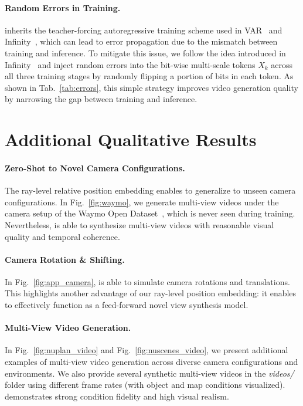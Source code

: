 \paragraph{Random Errors in Training.}
\ourmethod{} inherits the teacher-forcing autoregressive training scheme used in VAR~\cite{tian2024visual} and Infinity~\cite{han2024infinity}, which can lead to error propagation due to the mismatch between training and inference. To mitigate this issue, we follow the idea introduced in Infinity~\cite{han2024infinity} and inject random errors into the bit-wise multi-scale tokens $X_k$ across all three training stages by randomly flipping a portion of bits in each token. As shown in Tab.~\ref{tab:errors}, this simple strategy improves video generation quality by narrowing the gap between training and inference.

\section{Additional Qualitative Results}
\label{app:results}

\paragraph{Zero-Shot to Novel Camera Configurations.} The ray-level relative position embedding enables \ourmethod{} to generalize to unseen camera configurations. In Fig.~\ref{fig:waymo}, we generate multi-view videos under the camera setup of the Waymo Open Dataset~\cite{sun2020scalability}, which is never seen during training. Nevertheless, \ourmethod{} is able to synthesize multi-view videos with reasonable visual quality and temporal coherence.

\paragraph{Camera Rotation \& Shifting.} In Fig.~\ref{fig:app_camera}, \ourmethod{} is able to simulate camera rotations and translations. This highlights another advantage of our ray-level position embedding: it enables \ourmethod{} to effectively function as a feed-forward novel view synthesis model.

\paragraph{Multi-View Video Generation.} In Fig.~\ref{fig:nuplan_video} and Fig.~\ref{fig:nuscenes_video}, we present additional examples of multi-view video generation across diverse camera configurations and environments. We also provide several synthetic multi-view videos in the \textit{videos/} folder using different frame rates (with object and map conditions visualized). \ourmethod{} demonstrates strong condition fidelity and high visual realism.

